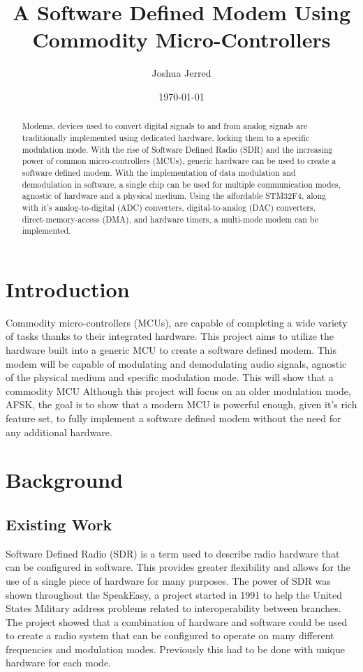 \documentclass[notitlepage]{report}
\title{A Software Defined Modem Using Commodity Micro-Controllers}
\author{Joshua Jerred}
\date{\today}
\begin{document}
\maketitle

\begin{abstract}
  Modems, devices used to convert digital signals to and from analog signals are traditionally implemented using dedicated hardware, locking them to a specific modulation mode. With the rise of Software Defined Radio (SDR) and the increasing power of common micro-controllers (MCUs), generic hardware can be used to create a software defined modem. With the implementation of data modulation and demodulation in software, a single chip can be used for multiple communication modes, agnostic of hardware and a physical medium. Using the affordable STM32F4, along with it's analog-to-digital (ADC) converters, digital-to-analog (DAC) converters, direct-memory-access (DMA), and hardware timers, a multi-mode modem can be implemented.
\end{abstract}
  
\section{Introduction}

Commodity micro-controllers (MCUs), are capable of completing a wide variety of tasks thanks to their integrated hardware. This project aims to utilize the hardware built into a generic MCU to create a software defined modem. This modem will be capable of modulating and demodulating audio signals, agnostic of the physical medium and specific modulation mode. This will show that a commodity MCU  Although this project will focus on an older modulation mode, AFSK, the goal is to show that a modern MCU is powerful enough, given it's rich feature set, to fully implement a software defined modem without the need for any additional hardware.

\section{Background}

\subsection{Existing Work}

Software Defined Radio (SDR) is a term used to describe radio hardware that can be configured in software. This provides greater flexibility and allows for the use of a single piece of hardware for many purposes. The power of SDR was shown throughout the SpeakEasy, a project started in 1991 to help the United States Military address problems related to interoperability between branches\cite{speakeasy}. The project showed that a combination of hardware and software could be used to create a radio system that can be configured to operate on many different frequencies and modulation modes. Previously this had to be done with unique hardware for each mode.
\end{document}
